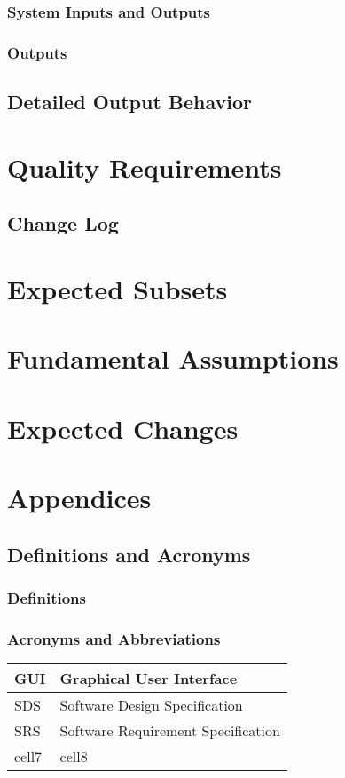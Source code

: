 \documentclass[a4paper, 11pt]{article}
\begin{document}
\subsubsection{System Inputs and Outputs}
\subsubsection{Outputs}
\subsection{Detailed Output Behavior}

\section{Quality Requirements}
\subsection{Change Log}
\section{Expected Subsets}

\section{Fundamental Assumptions}

\section{Expected Changes}

\section{Appendices}

\subsection{Definitions and Acronyms}
\subsubsection{Definitions}
\subsubsection{Acronyms and Abbreviations}

	\begin{tabular}{ | m{1cm} | m{10cm} | } 
		\hline
		GUI & Graphical User Interface \\
		\hline
		SDS & Software Design Specification \\
		\hline
		SRS & Software Requirement Specification  \\
		\hline
		cell7 & cell8 \\
		\hline
	\end{tabular}
\end{document}
